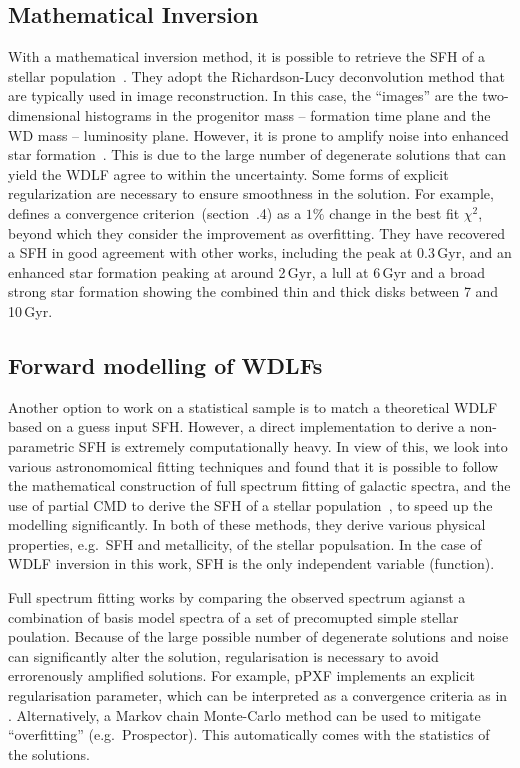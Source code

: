 \documentclass[fleqn,usenatbib]{mnras}
\begin{document}
\subsection{Mathematical Inversion}
With a mathematical inversion method, it is possible to retrieve the SFH of a
stellar population~\citep{2013MNRAS.434.1549R}. They adopt the Richardson-Lucy 
deconvolution method that are typically used in image reconstruction. In this
case, the ``images'' are the two-dimensional histograms in the
progenitor mass -- formation time plane and the WD mass -- luminosity plane. 
However, it is prone to amplify noise into enhanced star 
formation~\citep{2014ApJ...791...92T}. This is due to the large number of
degenerate solutions that can yield the WDLF agree to within the uncertainty.
Some forms of explicit regularization are necessary to ensure smoothness in the
solution. For example, \citet{2013MNRAS.434.1549R} defines a convergence
criterion~(section~.4) as a $1\%$ change in the best fit
$\chi^2$, beyond which they consider the improvement as overfitting. They have 
recovered a SFH in good agreement with other works, including the peak at
0.3\,Gyr, and an enhanced star formation peaking at around 2\,Gyr, a lull at
6\,Gyr and a broad strong star formation showing the combined thin and thick
disks between 7 and 10\,Gyr.

\subsection{Forward modelling of WDLFs}
Another option to work on a statistical sample is to match a theoretical
WDLF based on a guess input SFH. However, a direct implementation to derive a
non-parametric SFH is extremely computationally heavy. In view of this, we look
into various astronomomical fitting techniques and found that it is possible to
follow the mathematical construction of full spectrum fitting of galactic
spectra, and the use of partial CMD to derive the SFH of a stellar
population~\citep{2006A&A...459..783C}, to speed up the modelling significantly.
In both of these methods, they derive various physical properties, e.g.\ SFH and
metallicity, of the stellar populsation. In the case of WDLF inversion in this
work, SFH is the only independent variable (function).

Full spectrum fitting works by comparing the observed spectrum agianst a
combination of basis model spectra of a set of precomupted simple stellar
poulation. Because of the large possible number of degenerate solutions and
noise can significantly alter the solution, regularisation is necessary to
avoid errorenously amplified solutions. For example, pPXF implements an explicit
regularisation parameter, which can be interpreted as a convergence criteria as
in \citet{2013MNRAS.434.1549R}. Alternatively, a Markov chain Monte-Carlo method
can be used to mitigate ``overfitting'' (e.g.\ Prospector). This automatically
comes with the statistics of the solutions.
\end{document}
